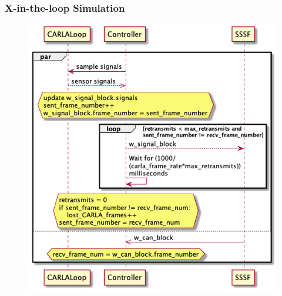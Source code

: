 \documentclass[letterpaper,twocolumn,12pt]{article}
\begin{document}
\subsubsection{X-in-the-loop Simulation}
\begin{figure}[t!]
    \centering
    \includegraphics[width=\linewidth]{out/images/signal_control/signal_control.png}
    \caption{}
    \label{fig:}
\end{figure}
\end{document}
